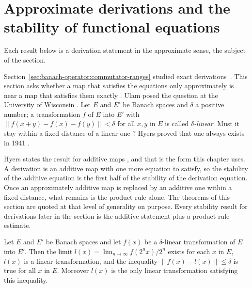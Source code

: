 \section{Approximate derivations and the stability of functional equations}\label{sec:banach-operator:stability}

Each result below is a derivation statement in the approximate sense, the
subject of the section. %

Section~\ref{sec:banach-operator:commutator-ranges} studied exact
derivations~\cite[Theorem~1, p.~223]{Hyers1941Stability}. This section asks whether a map that satisfies the equations
only approximately is near a map that satisfies them exactly
\cite[p.~222]{Hyers1941Stability}. Ulam posed the question at the
University of Wisconsin \cite[p.~222]{Hyers1941Stability}. Let $E$ and
$E'$ be Banach spaces and $\delta$ a positive number; a transformation
$f$ of $E$ into $E'$ with $\|f(x+y)-f(x)-f(y)\|<\delta$ for all $x,y$ in
$E$ is called \emph{$\delta$-linear}. Must it stay within a fixed
distance of a linear one \cite[p.~222]{Hyers1941Stability}? Hyers proved
that one always exists in 1941 \cite[Theorem~1, p.~223]{Hyers1941Stability}.

Hyers states the result for additive maps \cite[Theorem~1, p.~223]{Hyers1941Stability},
and that is the form this chapter uses. A derivation is an additive map with one
more equation to satisfy, so
the stability of the additive equation is the first half of the stability of
the derivation equation. Once an approximately additive map is replaced by an
additive one within a fixed distance, what remains is the product rule alone.
The theorems of this section are quoted at that level of generality on
purpose. Every stability result for derivations later in the section is
the additive statement plus a product-rule estimate.

\begin{theorem}\label{thm:banach:hyers}
Let $E$ and $E'$ be Banach spaces and let $f(x)$ be a $\delta$-linear
transformation of $E$ into $E'$. Then the limit
$l(x)=\lim_{n\to\infty}f(2^nx)/2^n$ exists for each $x$ in $E$, $l(x)$ is
a linear transformation, and the inequality $\|f(x)-l(x)\|\le\delta$ is
true for all $x$ in $E$. Moreover $l(x)$ is the only linear transformation
satisfying this inequality.
\end{theorem}


